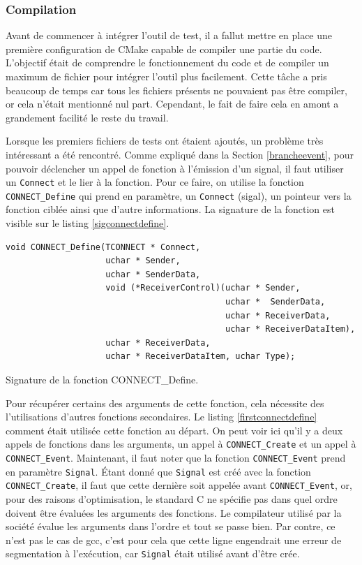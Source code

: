 \documentclass[a4paper]{article}
\begin{document}
\subsubsection*{Compilation}

Avant de commencer à intégrer l'outil de test, il a fallut mettre en place une
première configuration de CMake capable de compiler une partie du code.
L'objectif était de comprendre le fonctionnement du code et de compiler un
maximum de fichier pour intégrer l'outil plus facilement. Cette tâche a pris
beaucoup de temps car tous les fichiers présents ne pouvaient pas être compiler,
or cela n'était mentionné nul part. Cependant, le fait de faire cela en amont a
grandement facilité le reste du travail.

Lorsque les premiers fichiers de tests ont étaient ajoutés, un problème très
intéressant a été rencontré. Comme expliqué dans la Section \ref{brancheevent},
pour pouvoir déclencher un appel de fonction à l'émission d'un signal, il faut
utiliser un \verb|Connect| et le lier à la fonction. Pour ce faire, on utilise
la fonction \verb|CONNECT_Define| qui prend en paramètre, un \verb|Connect|
(sigal), un pointeur vers la fonction ciblée ainsi que d'autre informations. La
signature de la fonction est visible sur le listing \ref{sigconnectdefine}.

\begin{listing}[ht!]
\begin{verbatim}
void CONNECT_Define(TCONNECT * Connect,
                    uchar * Sender,
                    uchar * SenderData,
                    void (*ReceiverControl)(uchar * Sender,
                                            uchar *  SenderData,
                                            uchar * ReceiverData,
                                            uchar * ReceiverDataItem),
                    uchar * ReceiverData,
                    uchar * ReceiverDataItem, uchar Type);
\end{verbatim}
\caption{Signature de la fonction CONNECT\_Define.}
\label{sigconnectdefine}
\end{listing}

Pour récupérer certains des arguments de cette fonction, cela nécessite des
l'utilisations d'autres fonctions secondaires. Le listing
\ref{firstconnectdefine} comment était utilisée cette fonction au départ. On
peut voir ici qu'il y a deux appels de fonctions dans les arguments, un appel à
\verb|CONNECT_Create| et un appel à \verb|CONNECT_Event|. Maintenant, il faut
noter que la fonction \verb|CONNECT_Event| prend en paramètre \verb|Signal|.
Étant donné que \verb|Signal| est créé avec la fonction \verb|CONNECT_Create|,
il faut que cette dernière soit appelée avant \verb|CONNECT_Event|, or, pour
des raisons d'optimisation, le standard C ne spécifie pas dans quel ordre
doivent être évaluées les arguments des fonctions. Le compilateur utilisé par la
société évalue les arguments dans l'ordre et tout se passe bien. Par contre, ce
n'est pas le cas de gcc, c'est pour cela que cette ligne engendrait une erreur
de segmentation à l'exécution, car \verb|Signal| était utilisé avant d'être
crée.
\end{document}
